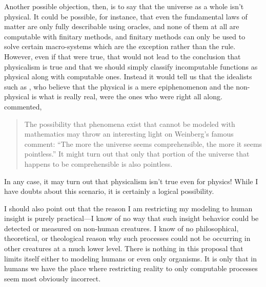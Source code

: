 Another possible objection, then, is to say that the universe as a whole isn't physical.  It could be possible, for instance, that even the fundamental laws of matter are only fully describable using oracles, and none of them at all are computable with finitary methods, and finitary methods can only be used to solve certain macro-systems which are the exception rather than the rule.  However, even if that were true, that would not lead to the conclusion that physicalism is true and that we should simply classify incomputable functions as physical along with computable ones.  Instead it would tell us that the idealists such as \citet{henry2005}, who believe that the physical is a mere epiphenomenon and the non-physical is what is really real, were the ones who were right all along.  \citet{robertson1999} commented,

\begin{quote}
The possibility that phenomena exist that cannot be modeled with mathematics may throw an interesting light on Weinberg's famous comment: ``The more the universe seems comprehensible, the more it seems pointless.'' It might turn out that only that portion of the universe that happens to be comprehensible is also pointless.
\end{quote}

In any case, it may turn out that physicalism isn't true even for physics!  While I have doubts about this scenario, it is certainly a logical possibility.

I should also point out that the reason I am restricting my modeling to human insight is purely practical---I know of no way that such insight behavior could be detected or measured on non-human creatures.  I know of no philosophical, theoretical, or theological reason why such processes could not be occurring in other creatures at a much lower level.  There is nothing in this proposal that limits itself either to modeling humans or even only organisms.  It is only that in humans we have the place where restricting reality to only computable processes seem most obviously incorrect.



